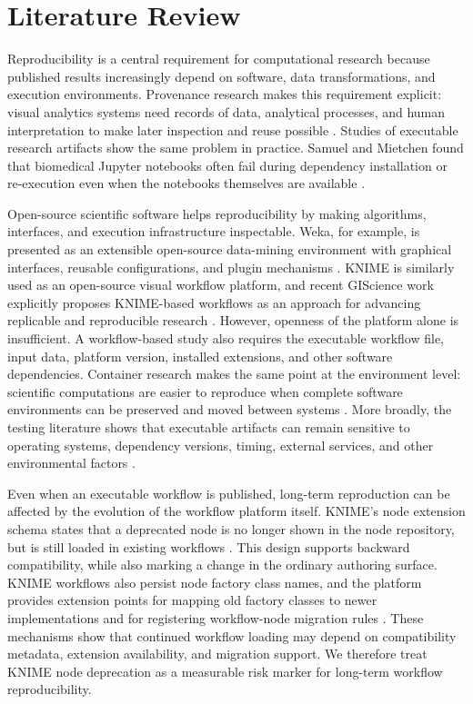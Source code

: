 \documentclass[runningheads]{llncs}
\begin{document}
\section{Literature Review}

Reproducibility is a central requirement for computational research because
published results increasingly depend on software, data transformations, and
execution environments. Provenance research makes this requirement explicit:
visual analytics systems need records of data, analytical processes, and human
interpretation to make later inspection and reuse possible
\cite{Walker2013ProveML}. Studies of executable research artifacts show the
same problem in practice. Samuel and Mietchen found that biomedical Jupyter
notebooks often fail during dependency installation or re-execution even when
the notebooks themselves are available
\cite{SamuelMietchen2024JupyterReproducibility}.

Open-source scientific software helps reproducibility by making algorithms,
interfaces, and execution infrastructure inspectable. Weka, for example, is
presented as an extensible open-source data-mining environment with graphical
interfaces, reusable configurations, and plugin mechanisms
\cite{Hall2009WEKA}. KNIME is similarly used as an open-source visual workflow
platform, and recent GIScience work explicitly proposes KNIME-based workflows
as an approach for advancing replicable and reproducible research
\cite{Fu2025GIScienceKNIME}. However, openness of the platform alone is
insufficient. A workflow-based study also requires the executable workflow
file, input data, platform version, installed extensions, and other software
dependencies. Container research makes the same point at the environment
level: scientific computations are easier to reproduce when complete software
environments can be preserved and moved between systems
\cite{Kurtzer2017Singularity}. More broadly, the testing literature shows that
executable artifacts can remain sensitive to operating systems, dependency
versions, timing, external services, and other environmental factors
\cite{Rasheed2023FlakinessReview}.

Even when an executable workflow is published, long-term reproduction can be
affected by the evolution of the workflow platform itself. KNIME's node extension
schema states that a deprecated node is no longer shown in the node repository,
but is still loaded in existing workflows
\cite{KNIMEWorkbenchNodeSchema2026}. This design supports backward
compatibility, while also marking a change in the ordinary authoring surface.
KNIME workflows also persist node factory class names, and the platform
provides extension points for mapping old factory classes to newer
implementations and for registering workflow-node migration rules
\cite{KNIMECoreClassMapperSchema2026,KNIMEMigrationRuleSchema2026}. These
mechanisms show that continued workflow loading may depend on compatibility
metadata, extension availability, and migration support. We therefore treat
KNIME node deprecation as a measurable risk marker for long-term workflow
reproducibility.
\end{document}

